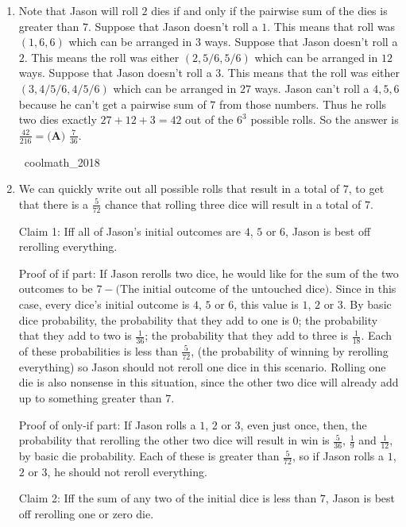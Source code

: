\documentclass{article}%
\begin{document}
\begin{enumerate}
%
\item%
Note that Jason will roll $2$ dies if and only if the pairwise sum of the dies is greater than $7$. Suppose that Jason doesn't roll a $1$. This means that roll was $(1, 6, 6)$ which can be arranged in $3$ ways. Suppose that Jason doesn't roll a $2$. This means the roll was either $(2, 5/6, 5/6)$ which can be arranged in $12$ ways. Suppose that Jason doesn't roll a $3$. This means that the roll was either $(3, 4/5/6, 4/5/6)$ which can be arranged in $27$ ways. Jason can't roll a $4, 5, 6$ because he can't get a pairwise sum of $7$ from those numbers. Thus he rolls two dies exactly $27 + 12 + 3 = 42$ out of the $6^3$ possible rolls. So the answer is $\frac{42}{216} = \boxed{\textbf{(A) } \frac{7}{36}}$. 

~coolmath\_2018

%
\item%
We can quickly write out all possible rolls that result in a total of $7$, to get that there is a $\frac{5}{72}$ chance that rolling three dice will result in a total of $7$.

Claim 1: Iff all of Jason's initial outcomes are $4$, $5$ or $6$, Jason is best off rerolling everything.

Proof of if part: If Jason rerolls two dice, he would like for the sum of the two outcomes to be $7-\text{(The initial outcome of the untouched dice)}$. Since in this case, every dice's initial outcome is $4$, $5$ or $6$, this value is $1$, $2$ or $3$. By basic dice probability, the probability that they add to one is $0$; the probability that they add to two is $\frac{1}{36}$; the probability that they add to three is $\frac{1}{18}$. Each of these probabilities is less than $\frac{5}{72}$, (the probability of winning by rerolling everything) so Jason should not reroll one dice in this scenario. Rolling one die is also nonsense in this situation, since the other two dice will already add up to something greater than $7$.

Proof of only-if part: If Jason rolls a $1$, $2$ or $3$, even just once, then, the probability that rerolling the other two dice will result in win is $\frac{5}{36}$, $\frac{1}{9}$ and $\frac{1}{12}$, by basic die probability. Each of these is greater than $\frac{5}{72}$, so if Jason rolls a $1$, $2$ or $3$, he should not reroll everything.

Claim 2: Iff the sum of any two of the initial dice is less than $7$, Jason is best off rerolling one or zero die.


\end{enumerate}
\end{document}
